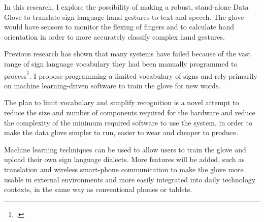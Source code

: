 

In this research, I explore the possibility of making a robust, stand-alone Data Glove to translate sign language hand gestures to text and speech. The glove would have sensors to monitor the flexing of fingers and to calculate hand orientation in order to more accurately classify complex hand gestures. 

Previous research has shown that many systems have failed because of the vast range of sign language vocabulary they had been manually programmed to process\footcite{DipietroL.SabatiniA.M.Dario2008}. I propose programming a limited vocabulary of signs and rely primarily on machine learning-driven software to train the glove for new words.

The plan to limit vocabulary and simplify recognition is a novel attempt to reduce the size and number of components required for the hardware and reduce the complexity of the minimum required software to use the system, in order to make the data glove simpler to run, easier to wear and cheaper to produce.

Machine learning techniques can be used to allow users to train the glove and upload their own sign language dialects. More features will be added, such as translation and wireless smart-phone communication to make the glove more usable in external environments and more easily integrated into daily technology contexts, in the same way as conventional phones or tablets.